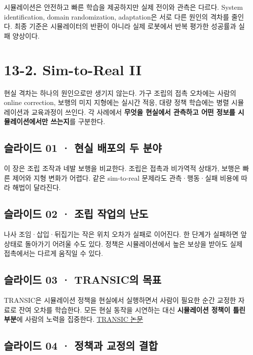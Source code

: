 \documentclass[11pt,a4paper]{article}
\begin{document}
시뮬레이션은 안전하고 빠른 학습을 제공하지만 실제 전이와 관측은 다르다. System identification, domain randomization, adaptation은 서로 다른 원인의 격차를 줄인다. 최종 기준은 시뮬레이터의 반환이 아니라 실제 로봇에서 반복 평가한 성공률과 실패 양상이다.\par

\clearpage
\section{13-2. Sim-to-Real II}


현실 격차는 하나의 원인으로만 생기지 않는다. 가구 조립의 접촉 오차에는 사람의 online correction, 보행의 미지 지형에는 실시간 적응, 대량 정책 학습에는 병렬 시뮬레이션과 교육과정이 쓰인다. 각 사례에서 \textbf{무엇을 현실에서 관측하고 어떤 정보를 시뮬레이션에서만 쓰는지}를 구분한다.\par

\subsection{슬라이드 01 · 현실 배포의 두 분야}

이 장은 조립 조작과 네발 보행을 비교한다. 조립은 접촉과 비가역적 상태가, 보행은 빠른 제어와 지형 변화가 어렵다. 같은 sim-to-real 문제라도 관측·행동·실패 비용에 따라 해법이 달라진다.\par

\subsection{슬라이드 02 · 조립 작업의 난도}

나사 조임·삽입·뒤집기는 작은 위치 오차가 실패로 이어진다. 한 단계가 실패하면 앞 상태로 돌아가기 어려울 수도 있다. 정책은 시뮬레이션에서 높은 보상을 받아도 실제 접촉에서는 다르게 움직일 수 있다.\par

\subsection{슬라이드 03 · TRANSIC의 목표}

TRANSIC은 시뮬레이션 정책을 현실에서 실행하면서 사람이 필요한 순간 교정한 자료로 잔여 오차를 학습한다. 모든 현실 동작을 시연하는 대신 \textbf{시뮬레이션 정책이 틀린 부분}에 사람의 노력을 집중한다. \href{https://arxiv.org/abs/2405.10315}{TRANSIC 논문}\par

\subsection{슬라이드 04 · 정책과 교정의 결합}
\end{document}
